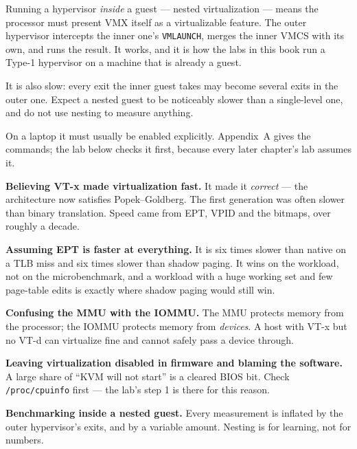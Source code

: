 \begin{alertbox}
Running a hypervisor \emph{inside} a guest --- nested virtualization --- means
the processor must present VMX itself as a virtualizable feature. The outer
hypervisor intercepts the inner one's \texttt{VMLAUNCH}, merges the inner
VMCS with its own, and runs the result. It works, and it is how the labs in
this book run a Type-1 hypervisor on a machine that is already a guest.

\smallskip
It is also slow: every exit the inner guest takes may become several exits in
the outer one. Expect a nested guest to be noticeably slower than a
single-level one, and do not use nesting to measure anything.

\smallskip
On a laptop it must usually be enabled explicitly. Appendix~A gives the
commands; the lab below checks it first, because every later chapter's lab
assumes it.
\end{alertbox}

\begin{pitfall}
\begin{tight}
  \item \textbf{Believing VT-x made virtualization fast.} It made it
        \emph{correct} --- the architecture now satisfies Popek--Goldberg. The
        first generation was often slower than binary translation. Speed came
        from EPT, VPID and the bitmaps, over roughly a decade.
  \item \textbf{Assuming EPT is faster at everything.} It is six times slower
        than native on a TLB miss and six times slower than shadow paging. It
        wins on the workload, not on the microbenchmark, and a workload with a
        huge working set and few page-table edits is exactly where shadow
        paging would still win.
  \item \textbf{Confusing the MMU with the IOMMU.} The MMU protects memory from
        the processor; the IOMMU protects memory from \emph{devices}. A host
        with VT-x but no VT-d can virtualize fine and cannot safely pass a
        device through.
  \item \textbf{Leaving virtualization disabled in firmware and blaming the
        software.} A large share of ``KVM will not start'' is a cleared BIOS
        bit. Check \texttt{/proc/cpuinfo} first --- the lab's step 1 is there
        for this reason.
  \item \textbf{Benchmarking inside a nested guest.} Every measurement is
        inflated by the outer hypervisor's exits, and by a variable amount.
        Nesting is for learning, not for numbers.
\end{tight}
\end{pitfall}

